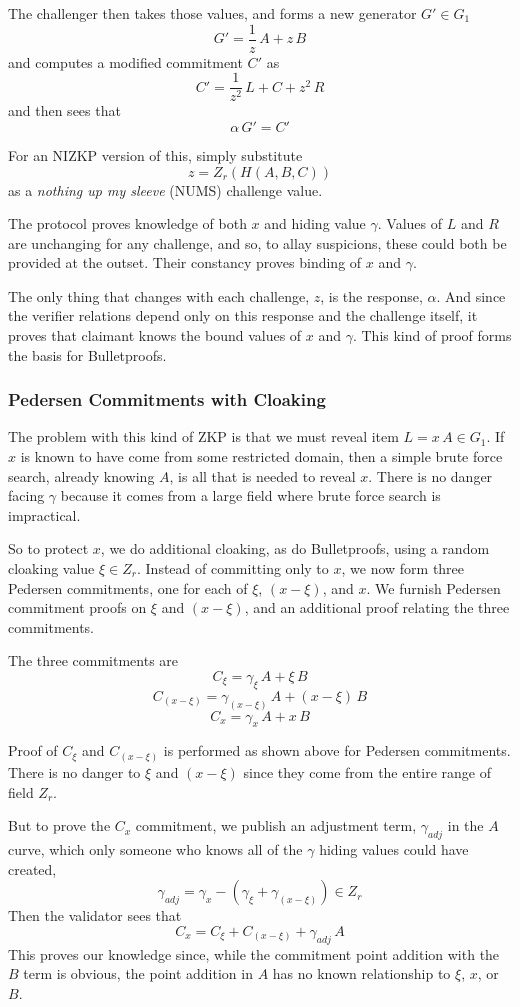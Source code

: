 \documentclass{yellowpaper}
\begin{document}
The challenger then takes those values, and forms a new generator $G' \in G_1$
$$G' = \frac{1}{z}\, A + z \, B$$
and computes a modified commitment $C'$ as
$$C' =  \frac{1}{z^2}\, L + C + z^2 \, R$$
and then sees that
$$ \alpha \, G' = C'$$

For an NIZKP version of this, simply substitute 
$$z = Z_r(H(A, B, C))$$ 
as a {\em{nothing up my sleeve}} (NUMS) challenge value.

The protocol proves knowledge of both $x$ and hiding value $\gamma$. Values of $L$ and $R$ are unchanging for any challenge, and so, to allay suspicions, these could both be provided at the outset. Their constancy proves binding of $x$ and $\gamma$. 

The only thing that changes with each challenge, $z$, is the response, $\alpha$. And since the verifier relations depend only on this response and the challenge itself, it proves that claimant knows the bound values of $x$ and $\gamma$. This kind of proof forms the basis for Bulletproofs. 

\subsubsection{Pedersen Commitments with Cloaking}
The problem with this kind of ZKP is that we must reveal item $L =x \, A \in G_1$. If $x$ is known to have come from some restricted domain, then a simple brute force search, already knowing $A$, is all that is needed to reveal $x$. There is no danger facing $\gamma$ because it comes from a large field where brute force search is impractical.

So to protect  $x$, we do additional cloaking, as do Bulletproofs, using a random cloaking value $\xi \in Z_r$. Instead of committing only to $x$, we now form three Pedersen commitments, one for each of $\xi$, $(x - \xi)$, and $x$. We furnish Pedersen commitment proofs on $\xi$ and $(x-\xi)$, and an additional proof relating the three commitments. 

The three commitments are
$$C_\xi = \gamma_\xi \, A + \xi \, B$$
$$C_{(x-\xi)} = \gamma_{(x-\xi)} \, A + (x - \xi)\, B$$
$$C_x = \gamma_x \, A + x \, B$$

Proof of $C_\xi$ and $C_{(x-\xi)}$ is performed as shown above for Pedersen commitments. There is no danger to $\xi$ and $(x - \xi)$ since they come from the entire range of field $Z_r$. 

But to prove the $C_x$ commitment, we publish an adjustment term, $\gamma_{adj}$ in the $A$ curve, which only someone who knows all of the $\gamma$ hiding values could have created,
$$\gamma_{adj} = \gamma_x - (\gamma_\xi + \gamma_{(x-\xi)}) \in Z_r$$
Then the validator sees that
$$C_x = C_\xi + C_{(x-\xi)} + \gamma_{adj} \, A$$
This proves our knowledge since, while the commitment point addition with the $B$ term is obvious, the point addition in $A$ has no known relationship to $\xi$, $x$, or $B$. 
\end{document}

